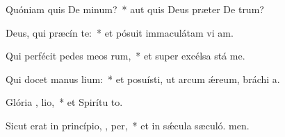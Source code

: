 \item Quóniam quis De  minum?~* aut quis Deus præter De trum?
\item Deus, qui præcín  te:~* et pósuit immaculátam vi am.
\item Qui perfécit pedes meos  rum,~* et super excélsa stá me.
\item Qui docet manus   lium:~* et posuísti, ut arcum ǽreum, bráchi a.
\item Glória ,  lio,~* et Spirítu to.
\item Sicut erat in princípio,  ,  per,~* et in sǽcula sæculó. men.
